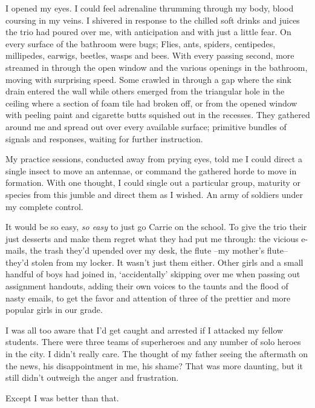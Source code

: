 I opened my eyes.  I could feel adrenaline thrumming through my body, blood coursing in my veins.  I shivered in response to the chilled soft drinks and juices the trio had poured over me, with anticipation and with just a little fear.  On every surface of the bathroom were bugs; Flies, ants, spiders, centipedes, millipedes, earwigs, beetles, wasps and bees.  With every passing second, more streamed in through the open window and the various openings in the bathroom, moving with surprising speed.  Some crawled in through a gap where the sink drain entered the wall while others emerged from the triangular hole in the ceiling where a section of foam tile had broken off, or from the opened window with peeling paint and cigarette butts squished out in the recesses.  They gathered around me and spread out over every available surface; primitive bundles of signals and responses, waiting for further instruction.



My practice sessions, conducted away from prying eyes, told me I could direct a single insect to move an antennae, or command the gathered horde to move in formation.  With one thought, I could single out a particular group, maturity or species from this jumble and direct them as I wished.  An army of soldiers under my complete control.



It would be so easy, \emph{so easy} to just go Carrie on the school.  To give the trio their just desserts and make them regret what they had put me through: the vicious e-mails, the trash they'd upended over my desk, the flute –my mother's flute– they'd stolen from my locker.  It wasn't just them either.  Other girls and a small handful of boys had joined in, `accidentally' skipping over me when passing out assignment handouts, adding their own voices to the taunts and the flood of nasty emails, to get the favor and attention of three of the prettier and more popular girls in our grade.



I was all too aware that I'd get caught and arrested if I attacked my fellow students.  There were three teams of superheroes and any number of solo heroes in the city.  I didn't really care.  The thought of my father seeing the aftermath on the news, his disappointment in me, his shame?  That was more daunting, but it still didn't outweigh the anger and frustration.



Except I was better than that.




